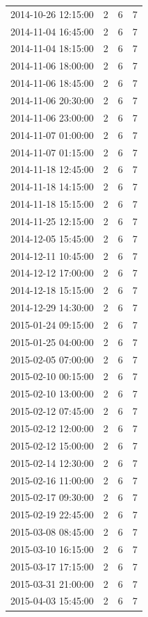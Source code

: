 \begin{tabular}{lrrr}
2014-10-26 12:15:00 & 2 & 6 & 7 \\
2014-11-04 16:45:00 & 2 & 6 & 7 \\
2014-11-04 18:15:00 & 2 & 6 & 7 \\
2014-11-06 18:00:00 & 2 & 6 & 7 \\
2014-11-06 18:45:00 & 2 & 6 & 7 \\
2014-11-06 20:30:00 & 2 & 6 & 7 \\
2014-11-06 23:00:00 & 2 & 6 & 7 \\
2014-11-07 01:00:00 & 2 & 6 & 7 \\
2014-11-07 01:15:00 & 2 & 6 & 7 \\
2014-11-18 12:45:00 & 2 & 6 & 7 \\
2014-11-18 14:15:00 & 2 & 6 & 7 \\
2014-11-18 15:15:00 & 2 & 6 & 7 \\
2014-11-25 12:15:00 & 2 & 6 & 7 \\
2014-12-05 15:45:00 & 2 & 6 & 7 \\
2014-12-11 10:45:00 & 2 & 6 & 7 \\
2014-12-12 17:00:00 & 2 & 6 & 7 \\
2014-12-18 15:15:00 & 2 & 6 & 7 \\
2014-12-29 14:30:00 & 2 & 6 & 7 \\
2015-01-24 09:15:00 & 2 & 6 & 7 \\
2015-01-25 04:00:00 & 2 & 6 & 7 \\
2015-02-05 07:00:00 & 2 & 6 & 7 \\
2015-02-10 00:15:00 & 2 & 6 & 7 \\
2015-02-10 13:00:00 & 2 & 6 & 7 \\
2015-02-12 07:45:00 & 2 & 6 & 7 \\
2015-02-12 12:00:00 & 2 & 6 & 7 \\
2015-02-12 15:00:00 & 2 & 6 & 7 \\
2015-02-14 12:30:00 & 2 & 6 & 7 \\
2015-02-16 11:00:00 & 2 & 6 & 7 \\
2015-02-17 09:30:00 & 2 & 6 & 7 \\
2015-02-19 22:45:00 & 2 & 6 & 7 \\
2015-03-08 08:45:00 & 2 & 6 & 7 \\
2015-03-10 16:15:00 & 2 & 6 & 7 \\
2015-03-17 17:15:00 & 2 & 6 & 7 \\
2015-03-31 21:00:00 & 2 & 6 & 7 \\
2015-04-03 15:45:00 & 2 & 6 & 7 \\

\end{tabular}
